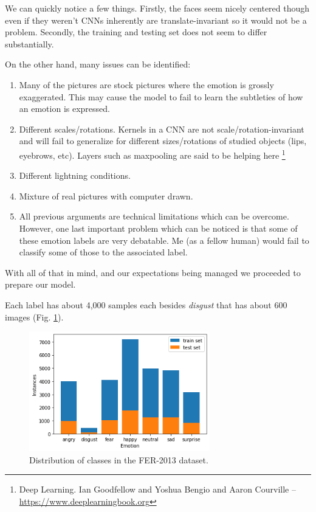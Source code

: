\documentclass{ledger}
\begin{document}
We can quickly notice a few things. Firstly, the faces seem nicely centered though even if they weren't CNNs inherently are translate-invariant so it would not be a problem. Secondly, the training and testing set does not seem to differ substantially.

On the other hand, many issues can be identified:

\begin{enumerate}
	\item  Many of the pictures are stock pictures where the emotion is grossly exaggerated. This may cause the model to fail to learn the subtleties of how an emotion is expressed.
	\item Different scales/rotations. Kernels in a CNN are not scale/rotation-invariant and will fail to generalize for different sizes/rotations of studied objects (lips, eyebrows, etc). Layers such as maxpooling are said to be helping here \footnote{Deep Learning. Ian Goodfellow and Yoshua Bengio and Aaron Courville -- \url{https://www.deeplearningbook.org}}
	\item Different lightning conditions.
	\item Mixture of real pictures with computer drawn.
	\item All previous arguments are technical limitations which can be overcome. However, one last important problem which can be noticed is that some of these emotion labels are very debatable. Me (as a fellow human) would fail to classify some of those to the associated label.
\end{enumerate}

With all of that in mind, and our expectations being managed we proceeded to prepare our model.

Each label has about 4,000 samples each besides \textit{disgust} that has about 600 images (Fig. \ref{fig:images-classes}).

\begin{figure}[H]
	\centering
	\includegraphics[width=0.7\textwidth]{assets/image_dataset.png}
	\caption{Distribution of classes in the FER-2013 dataset.}
	\label{fig:images-classes}
\end{figure}
\end{document}
